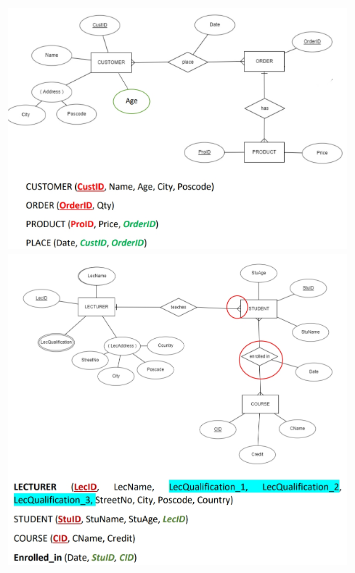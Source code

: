 \documentclass[a4paper, 12pt]{article}
\begin{document}
       \begin{figure}[H]  
        \includegraphics[width=0.8\textwidth]{chapter2c_12.png}
        \includegraphics[width=0.8\textwidth]{chapter2c_13.png}
       \end{figure}

    \vspace{3cm}
\end{document}
